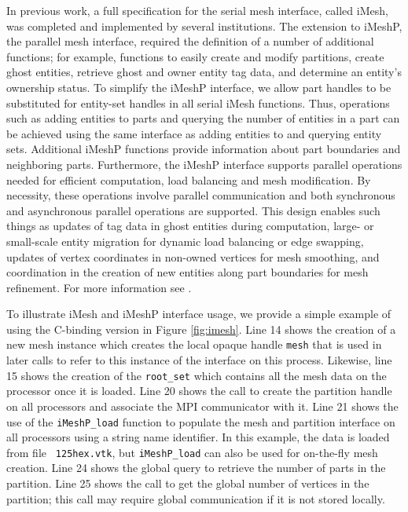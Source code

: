 \documentclass[letterpaper]{jpconf}
\begin{document}
In previous work, a full specification for the serial mesh interface,
called iMesh, was completed and implemented by several
institutions. The extension to iMeshP, the parallel mesh interface,
required the definition of a number of additional functions; for
example, functions to easily create and modify partitions, create
ghost entities, retrieve ghost and owner entity tag data, and
determine an entity's ownership status.  To simplify the iMeshP
interface, we allow part handles to be substituted for entity-set
handles in all serial iMesh functions.  Thus, operations such as
adding entities to parts and querying the number of entities in a part
can be achieved using the same interface as adding entities to and
querying entity sets.  Additional iMeshP functions provide information
about part boundaries and neighboring parts.  Furthermore, the iMeshP
interface supports parallel operations needed for efficient
computation, load balancing and mesh modification.  By necessity,
these operations involve parallel communication and both synchronous
and asynchronous parallel operations are supported. This design
enables such things as updates of tag data in ghost entities during
computation, large- or small-scale entity migration for dynamic load
balancing or edge swapping, updates of vertex coordinates in non-owned
vertices for mesh smoothing, and coordination in the creation of new
entities along part boundaries for mesh refinement.  For more
information see \cite{imeshp_web}.

To illustrate iMesh and iMeshP interface usage, we provide a simple
example of using the C-binding version in Figure \ref{fig:imesh}. Line
14 shows the creation of a new mesh instance which creates the local
opaque handle {\tt mesh} that is used in later calls to refer to this
instance of the interface on this process. Likewise, line 15 shows the
creation of the {\tt root\_set} which contains all the mesh data on
the processor once it is loaded.  Line 20 shows the call to create the
partition handle on all processors and associate the MPI communicator
with it.  Line 21 shows the use of the {\tt iMeshP\_load} function to
populate the mesh and partition interface on all processors using a string name
identifier.  In this example, the data is loaded from file {\tt
125hex.vtk}, but {\tt iMeshP\_load} can also be used for on-the-fly
mesh creation.  Line 24 shows the global query to retrieve the number
of parts in the partition.  Line 25 shows the call to get the global
number of vertices in the partition; this call may require global
communication if it is not stored locally.
\end{document}
